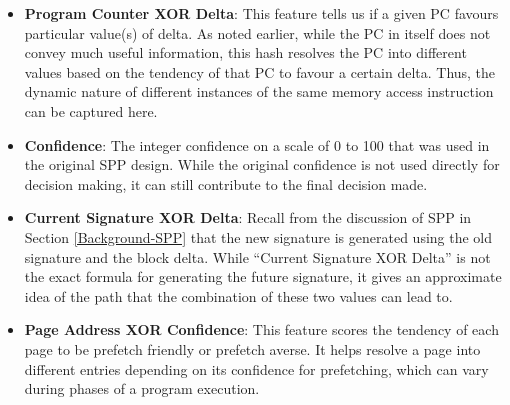 \begin{itemize}
\item \textbf{Program Counter XOR Delta}: This feature tells us if a given PC
  favours particular value(s) of delta.  As noted earlier, while the PC in
  itself does not convey much useful information, this hash resolves the PC
  into different values based on the tendency of that PC to favour a certain
  delta.  Thus, the dynamic nature of different instances of the same memory
  access instruction can be captured here.

\item \textbf{Confidence}: The integer confidence on a scale of 0 to
  100 that was used in the original SPP design.  While the original confidence
  is not used directly for decision making, it can still contribute to the
  final decision made.

\item \textbf{Current Signature XOR Delta}: Recall from
  the discussion of SPP in Section \ref{Background-SPP} that the new signature
  is generated using the old signature and the block delta.  While ``Current
  Signature XOR Delta'' is not the exact formula for generating the future
  signature, it gives an approximate idea of the path that the combination of
  these two values can lead to.

\item \textbf{Page Address XOR Confidence}: This feature scores the tendency
of each page to be prefetch friendly or prefetch averse. It helps resolve a
page into different entries depending on its confidence for prefetching, which
can vary during phases of a program execution.


\end{itemize} 

